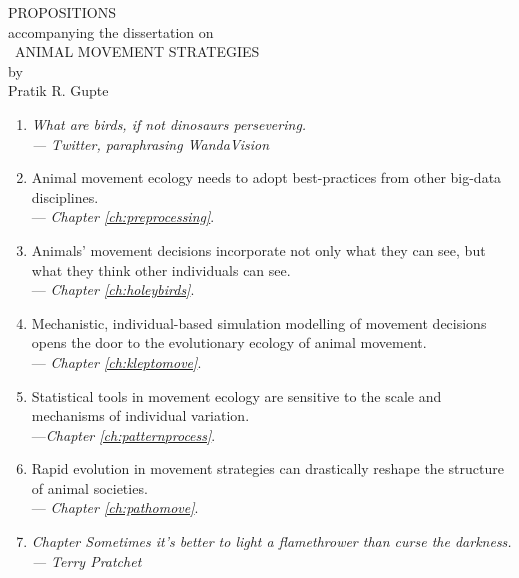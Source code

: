 \begingroup

\clearpage

\begin{doublespace}
    \begin{center}
        {\LARGE \textsf{PROPOSITIONS}} \\
        {\small accompanying the dissertation on}\\
        {\large \adftripleflourishleft~\textsf{ANIMAL MOVEMENT STRATEGIES}~\adftripleflourishright}\\
        by\\
        Pratik R. Gupte\\
    \end{center}
\end{doublespace}

\begin{onehalfspace}
    \begin{enumerate}
        \item \textit{What are birds, if not dinosaurs persevering.\\--- Twitter, paraphrasing WandaVision}

        \item Animal movement ecology needs to adopt best-practices from other big-data disciplines.\\ --- \textit{Chapter \ref{ch:preprocessing}}.

        \item Animals' movement decisions incorporate not only what they can see, but what they think other individuals can see.\\ --- \textit{Chapter \ref{ch:holeybirds}}.

        \item Mechanistic, individual-based simulation modelling of movement decisions opens the door to the evolutionary ecology of animal movement. \\ --- \textit{Chapter \ref{ch:kleptomove}}.

        \item Statistical tools in movement ecology are sensitive to the scale and mechanisms of individual variation.\\ ---\textit{Chapter \ref{ch:patternprocess}}.

        \item Rapid evolution in movement strategies can drastically reshape the structure of animal societies.\\ --- \textit{Chapter \ref{ch:pathomove}}.

        \item \textit{Chapter Sometimes it's better to light a flamethrower than curse the darkness.\\--- Terry Pratchet}
    \end{enumerate}

\end{onehalfspace}

\endgroup

\vfill

\clearpage
